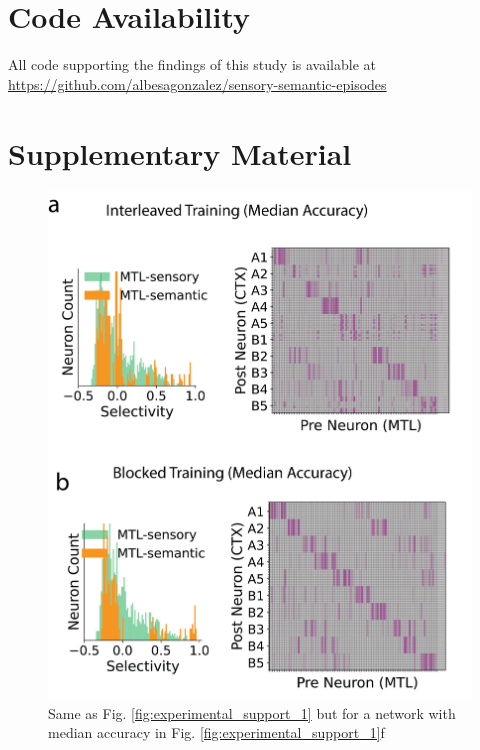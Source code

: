 \documentclass{article}
\begin{document}
\section*{Code Availability}
All code supporting the findings of this study is available at 
\url{https://github.com/albesagonzalez/sensory-semantic-episodes}

\clearpage
\section*{Supplementary Material}
\renewcommand{\thefigure}{S\arabic{figure}}
\setcounter{figure}{0} %

\begin{figure}[h!]
    \centering
    \includegraphics[width=0.65\linewidth]{Figures/Figure_5_supp.png}
    \caption{Same as Fig. \ref{fig:experimental_support_1} but for a network with median accuracy in Fig. \ref{fig:experimental_support_1}f}
    \label{fig:experimental_support_1_supp_1}
\end{figure}
\end{document}
